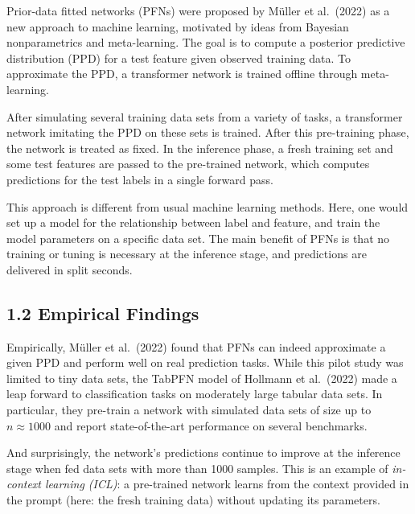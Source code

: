 \documentclass[aspectratio=169,10pt]{beamer}
\newcommand{\currentheading}{\ifx\insertsubsection\empty\insertsection\else\insertsubsection\fi}
\begin{document}
\begin{frame}{\currentheading}
Prior-data fitted networks (PFNs) were proposed by Müller et al.\ (2022) as a new approach to machine learning, motivated by ideas from Bayesian nonparametrics and meta-learning. The goal is to compute a posterior predictive distribution (PPD) for a test feature given observed training data. To approximate the PPD, a transformer network is trained offline through meta-learning.

After simulating several training data sets from a variety of tasks, a transformer network imitating the PPD on these sets is trained. After this pre-training phase, the network is treated as fixed. In the inference phase, a fresh training set and some test features are passed to the pre-trained network, which computes predictions for the test labels in a single forward pass.
\end{frame}

\begin{frame}{\currentheading}
This approach is different from usual machine learning methods. Here, one would set up a model for the relationship between label and feature, and train the model parameters on a specific data set. The main benefit of PFNs is that no training or tuning is necessary at the inference stage, and predictions are delivered in split seconds.
\end{frame}

\subsection{1.2 Empirical Findings}

\begin{frame}{\currentheading}
Empirically, Müller et al.\ (2022) found that PFNs can indeed approximate a given PPD and perform well on real prediction tasks. While this pilot study was limited to tiny data sets, the TabPFN model of Hollmann et al.\ (2022) made a leap forward to classification tasks on moderately large tabular data sets. In particular, they pre-train a network with simulated data sets of size up to $n \approx 1000$ and report state-of-the-art performance on several benchmarks.

And surprisingly, the network's predictions continue to improve at the inference stage when fed data sets with more than 1000 samples. This is an example of \emph{in-context learning (ICL)}: a pre-trained network learns from the context provided in the prompt (here: the fresh training data) without updating its parameters.
\end{frame}
\end{document}
